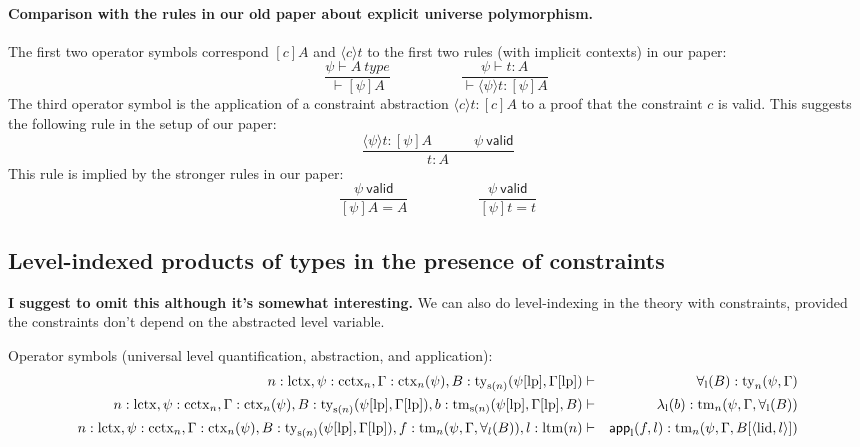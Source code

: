 \documentclass[11pt,a4paper]{article}
\theoremstyle{definition}
\newcommand{\valid}{\mathsf{valid}}
\newcommand{\app}[2]{{#1\,#2}} %
\def\lctx{\mathrm{lctx}}
\def\ltm{\mathrm{ltm}}
\def\lp{\mathrm{lp}}
\def\s{\mathrm{s}}
\def\lid{\mathrm{lid}}
\def\cctx{\mathrm{cctx}}
\newcommand{\ctx}{\mathrm{ctx}}
\newcommand{\ty}{\mathrm{ty}}
\newcommand{\tm}{\mathrm{tm}}
\newcommand{\tuple}[1]{\langle #1 \rangle}
\def\app{\mathsf{app}}
\begin{document}
\paragraph{Comparison with the rules in our old paper about explicit universe polymorphism.}
The first two operator symbols correspond $[c]A$ and $\langle c \rangle t$ to the first two rules (with implicit contexts) in our paper:
$$
\frac{\psi \vdash A\ type}{\vdash [\psi]A}
\hspace{5em}
\frac{\psi \vdash t : A}{\vdash \langle \psi \rangle t : [\psi]A}\
$$
The third operator symbol is the application of a constraint abstraction $\langle c \rangle t : [c]A$ to a proof that the constraint $c$ is valid. This suggests the following rule in the setup of our paper:
$$
\frac{\langle \psi \rangle t : [\psi]A\hspace{3em}\psi\ \valid}
{t : A}
$$
This rule is implied by the stronger rules in our paper:
$$
\frac
{\psi\ \valid}
{[\psi]A = A}
\hspace{5em}
\frac
{\psi\ \valid}
{[\psi]t  = t}
$$

\subsection{Level-indexed products of types in the presence of constraints}

{\bf I suggest to omit this although it's somewhat interesting.}
We can also do level-indexing in the theory with constraints, provided the constraints don't depend on the abstracted level variable.

\begin{tiny}
Operator symbols (universal level quantification, abstraction, and application):
\begin{eqnarray*}
n : \lctx, \psi : \cctx_{n}, \Gamma : \ctx_n(\psi), B : \ty_{\s(n)}(\psi[\lp],\Gamma[\lp])&\vdash& \forall_\l(B) : \ty_n(\psi,\Gamma)\\
n : \lctx, \psi : \cctx_{n}, \Gamma : \ctx_n(\psi), B : \ty_{\s(n)}(\psi[\lp],\Gamma[\lp]), b : \tm_{\s(n)}(\psi[\lp],\Gamma[\lp], B) &\vdash&  \lambda_\l(b) : \tm_n(\psi,\Gamma,\forall_\l(B))\\
n : \lctx, \psi : \cctx_{n}, \Gamma : \ctx_n(\psi), B : \ty_{\s(n)}(\psi[\lp],\Gamma[\lp]), f :  \tm_n(\psi,\Gamma,\forall_l(B)),  l : \ltm(n) &\vdash& \app_\l(f,l) : \tm_n(\psi,\Gamma, B[\tuple{\lid,l}])
\end{eqnarray*}
\end{tiny}
\end{document}
